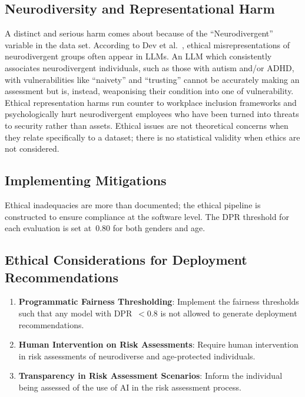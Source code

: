 \documentclass[conference]{IEEEtran}
\begin{document}
\subsection{Neurodiversity and Representational Harm}
A distinct and serious harm comes about because of the ``Neurodivergent'' variable in the data set. According to Dev et al.~\cite{dev2021measures}, ethical misrepresentations of neurodivergent groups often appear in LLMs. An LLM which consistently associates neurodivergent individuals, such as those with autism and/or ADHD, with vulnerabilities like ``naivety'' and ``trusting'' cannot be accurately making an assessment but is, instead, weaponising their condition into one of vulnerability. Ethical representation harms run counter to workplace inclusion frameworks and psychologically hurt neurodivergent employees who have been turned into threats to security rather than assets. Ethical issues are not theoretical concerns when they relate specifically to a dataset; there is no statistical validity when ethics are not considered.

\subsection{Implementing Mitigations}
Ethical inadequacies are more than documented; the ethical pipeline is constructed to ensure compliance at the software level. The DPR threshold for each evaluation is set at~$0.80$ for both genders and age.

\subsection{Ethical Considerations for Deployment Recommendations}
\begin{enumerate}[leftmargin=*]
    \item \textbf{Programmatic Fairness Thresholding}: Implement the fairness thresholds such that any model with DPR~$< 0.8$ is not allowed to generate deployment recommendations.
    \item \textbf{Human Intervention on Risk Assessments}: Require human intervention in risk assessments of neurodiverse and age-protected individuals.
    \item \textbf{Transparency in Risk Assessment Scenarios}: Inform the individual being assessed of the use of AI in the risk assessment process.
\end{enumerate}

\end{document}
